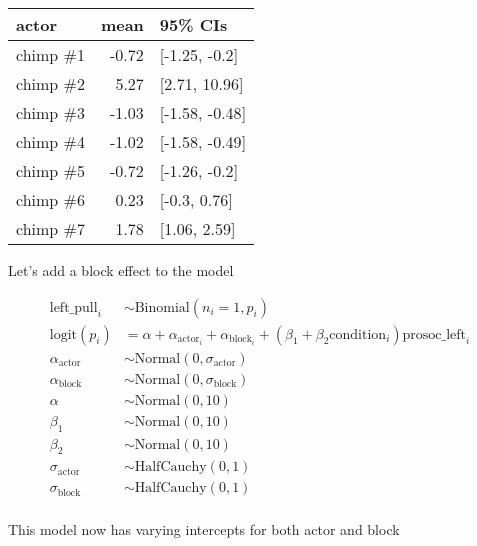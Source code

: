 \documentclass[12pt,]{article}
\begin{document}
{\begin{longtable}[]{@{}lrl@{}}
\toprule
actor & mean & 95\% CIs\tabularnewline
\midrule
\endhead
chimp \#1 & -0.72 & {[}-1.25, -0.2{]}\tabularnewline
chimp \#2 & 5.27 & {[}2.71, 10.96{]}\tabularnewline
chimp \#3 & -1.03 & {[}-1.58, -0.48{]}\tabularnewline
chimp \#4 & -1.02 & {[}-1.58, -0.49{]}\tabularnewline
chimp \#5 & -0.72 & {[}-1.26, -0.2{]}\tabularnewline
chimp \#6 & 0.23 & {[}-0.3, 0.76{]}\tabularnewline
chimp \#7 & 1.78 & {[}1.06, 2.59{]}\tabularnewline
\bottomrule
\end{longtable}

Let's add a block effect to the model

\[
\begin{aligned}
\text{left_pull}_i &\sim \text{Binomial}(n_i = 1, p_i)\\
\text{logit}(p_i) &= \alpha + \alpha_{\text{actor}_i} + \alpha_{\text{block}_i} + (\beta_1 + \beta_2\text{condition}_i)\text{prosoc_left}_i\\
\alpha_{\text{actor}} &\sim \text{Normal}(0, \sigma_{\text{actor}})\\
\alpha_{\text{block}} &\sim \text{Normal}(0, \sigma_{\text{block}})\\
\alpha &\sim \text{Normal}(0, 10)\\
\beta_1 &\sim \text{Normal}(0, 10)\\
\beta_2 &\sim \text{Normal}(0, 10)\\
\sigma_{\text{actor}} &\sim \text{HalfCauchy}(0, 1)\\
\sigma_{\text{block}} &\sim \text{HalfCauchy}(0,1)\\
\end{aligned}
\]

This model now has varying intercepts for both actor and block

}
\end{document}
